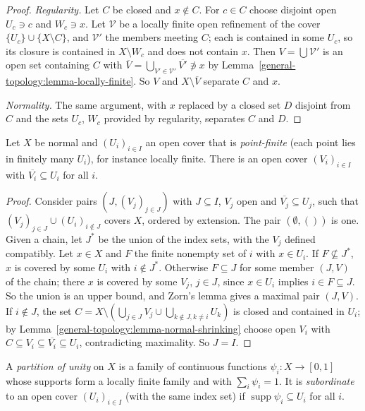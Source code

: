 \begin{proof}
\emph{Regularity.} Let $C$ be closed and $x \notin C$. For $c \in C$ choose disjoint open $U_c \ni c$ and $W_c \ni x$. Let $\mathcal{V}$ be a locally finite
open refinement of the cover $\{U_c\} \cup \{X \setminus C\}$, and $\mathcal{V}'$ the members meeting $C$; each is contained in some $U_c$, so its closure is
contained in $X \setminus W_c$ and does not contain $x$. Then $V = \bigcup \mathcal{V}'$ is an open set containing $C$ with
$\overline{V} = \bigcup_{V' \in \mathcal{V}'} \overline{V'} \not\ni x$ by Lemma~\ref{general-topology:lemma-locally-finite}. So $V$ and $X \setminus \overline{V}$
separate $C$ and $x$.

\emph{Normality.} The same argument, with $x$ replaced by a closed set $D$ disjoint from $C$ and the sets $U_c$, $W_c$ provided by regularity, separates
$C$ and $D$.
\end{proof}

\begin{lemma}\label{general-topology:lemma-shrinking}
Let $X$ be normal and $(U_i)_{i \in I}$ an open cover that is \emph{point-finite} (each point lies in finitely many $U_i$), for instance locally finite.
There is an open cover $(V_i)_{i \in I}$ with $\overline{V_i} \subseteq U_i$ for all $i$.
\end{lemma}

\begin{proof}
Consider pairs $(J, (V_j)_{j \in J})$ with $J \subseteq I$, $V_j$ open and $\overline{V_j} \subseteq U_j$, such that $(V_j)_{j \in J} \cup (U_i)_{i \notin J}$ covers
$X$, ordered by extension. The pair $(\emptyset, ())$ is one. Given a chain, let $J^*$ be the union of the index sets, with the $V_j$ defined compatibly. Let
$x \in X$ and $F$ the finite nonempty set of $i$ with $x \in U_i$. If $F \not\subseteq J^*$, $x$ is covered by some $U_i$ with $i \notin J^*$. Otherwise
$F \subseteq J$ for some member $(J, V)$ of the chain; there $x$ is covered by some $V_j$, $j \in J$, since $x \in U_i$ implies $i \in F \subseteq J$. So the union
is an upper bound, and Zorn's lemma gives a maximal pair $(J, V)$. If $i \notin J$, the set
$C = X \setminus (\bigcup_{j \in J} V_j \cup \bigcup_{k \notin J, k \neq i} U_k)$ is closed and contained in $U_i$; by
Lemma~\ref{general-topology:lemma-normal-shrinking} choose open $V_i$ with $C \subseteq V_i \subseteq \overline{V_i} \subseteq U_i$, contradicting maximality. So
$J = I$.
\end{proof}

\begin{definition}\label{general-topology:definition-partition-of-unity}
A \emph{partition of unity} on $X$ is a family of continuous functions $\psi_i \colon X \to [0, 1]$ whose supports form a locally finite family and with
$\sum_i \psi_i = 1$. It is \emph{subordinate} to an open cover $(U_i)_{i \in I}$ (with the same index set) if $\operatorname{supp} \psi_i \subseteq U_i$ for all
$i$.
\end{definition}

